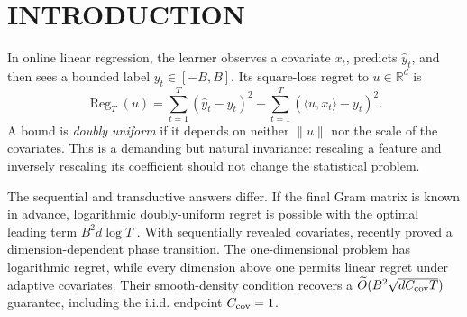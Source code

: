\documentclass[twoside]{article}
\newcommand{\R}{\mathbb R}
\newcommand{\Reg}{\operatorname{Reg}}
\begin{document}
\runningauthor{}


\begin{abstract}\sloppy
Online square-loss regression admits no sublinear regret bound that is simultaneously independent of the comparator norm and covariate scale in dimension above one when covariates are adaptive. We show that uniformly shuffling only the covariates changes the answer sharply, even if bounded labels remain fully adaptive. The unregularized Vovk--Azoury--Warmuth forecaster has expected regret at most $B^2\sum_{t\le T}\min(r,t)/t$, where $r$ is the final design rank. The result needs no norm, condition-number, distributional, or ambient-dimension bound. Its core is a distributional theorem for online leverage. Conditional on any fixed covariate multiset, the leverage sum is dominated in Laplace transform by $r+\sum_{t=r+1}^T\operatorname{Bernoulli}(r/t)$. This yields Bennett tails, an exact expected rank-profile formula, and kernelization by finite-span reduction. The domination is asymptotically exact in distribution already in one dimension. A Bayesian lower bound proves the minimax rate $\Theta(B^2r\log(eT/r))$ and recovers leading constant one in the large-block regime. Finally, entropy transport quantifies degradation under imperfect shuffling. The result isolates exchangeable covariate arrival as enough to recover the transductive logarithmic rate without randomizing the labels or revealing the final Gram matrix.
\end{abstract}

\section{INTRODUCTION}

In online linear regression, the learner observes a covariate $x_t$, predicts $\widehat y_t$, and then sees a bounded label $y_t\in[-B,B]$. Its square-loss regret to $u\in\R^d$ is \[ \Reg_T(u)=\sum_{t=1}^T(\widehat y_t-y_t)^2 -\sum_{t=1}^T(\langle u,x_t\rangle-y_t)^2. \] A bound is \emph{doubly uniform} if it depends on neither $\|u\|$ nor the scale of the covariates. This is a demanding but natural invariance: rescaling a feature and inversely rescaling its coefficient should not change the statistical problem.

The sequential and transductive answers differ. If the final Gram matrix is known in advance, logarithmic doubly-uniform regret is possible with the optimal leading term $B^2d\log T$ \citep{bartlett2015minimax,gaillard2019uniform}. With sequentially revealed covariates, \citet{chen2026self} recently proved a dimension-dependent phase transition. The one-dimensional problem has logarithmic regret, while every dimension above one permits linear regret under adaptive covariates. Their smooth-density condition recovers a $\widetilde O(B^2\sqrt{dC_{\rm cov}T})$ guarantee, including the i.i.d. endpoint $C_{\rm cov}=1$.
\end{document}
